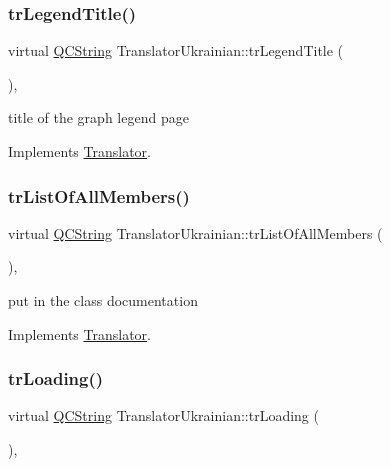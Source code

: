 \subsubsection{\texorpdfstring{trLegendTitle()}{trLegendTitle()}}
{\footnotesize\ttfamily virtual \mbox{\hyperlink{class_q_c_string}{Q\+C\+String}} Translator\+Ukrainian\+::tr\+Legend\+Title (\begin{DoxyParamCaption}{ }\end{DoxyParamCaption})\hspace{0.3cm}{\ttfamily [inline]}, {\ttfamily [virtual]}}

title of the graph legend page 

Implements \mbox{\hyperlink{class_translator}{Translator}}.

\mbox{\label{class_translator_ukrainian_aca8e03f9e54b1990ff311c34cce13aec}} 
\subsubsection{\texorpdfstring{trListOfAllMembers()}{trListOfAllMembers()}}
{\footnotesize\ttfamily virtual \mbox{\hyperlink{class_q_c_string}{Q\+C\+String}} Translator\+Ukrainian\+::tr\+List\+Of\+All\+Members (\begin{DoxyParamCaption}{ }\end{DoxyParamCaption})\hspace{0.3cm}{\ttfamily [inline]}, {\ttfamily [virtual]}}

put in the class documentation 

Implements \mbox{\hyperlink{class_translator}{Translator}}.

\mbox{\label{class_translator_ukrainian_a5148588076d070cc2ca46fba2dc7d272}} 
\subsubsection{\texorpdfstring{trLoading()}{trLoading()}}
{\footnotesize\ttfamily virtual \mbox{\hyperlink{class_q_c_string}{Q\+C\+String}} Translator\+Ukrainian\+::tr\+Loading (\begin{DoxyParamCaption}{ }\end{DoxyParamCaption})\hspace{0.3cm}{\ttfamily [inline]}, {\ttfamily [virtual]}}


